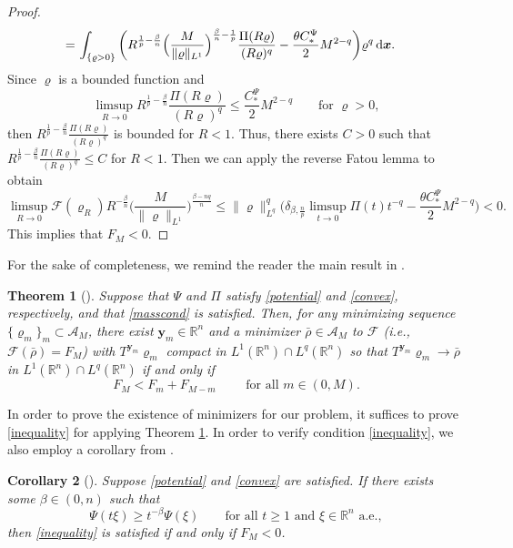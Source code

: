\documentclass[reqno,11pt]{amsart}
\numberwithin{equation}{section}
\newtheorem{theorem}{Theorem}[section]
\newtheorem{corollary}[theorem]{Corollary}
\theoremstyle{definition}
\def\dd{{\, \rm d}}
\begin{document}
\begin{proof}
\begin{align*}
= &\,\int_{\{\varrho > 0\}} \bigg ( R^{\frac{1}{p} 
- \frac{\beta}{n}} 
\Big( \frac{M}{\| \varrho \|_{L^1}} \Big)^{\frac{\beta}{n}-\frac{1}{p}}\frac{\Pi(R\varrho)}{(R\varrho)^q} 
- \frac{\theta C_*^\Psi}{2} M^{2-q} \bigg ) \varrho^q \dd \boldsymbol{x}.
\end{align*}
Since $\varrho$ is a bounded function and 
$$
\limsup_{R \to 0} R^{\frac{1}{p} - \frac{\beta}{n}}\frac{\Pi(R \varrho)}{(R \varrho)^q} 
\leq  \frac{C_*^\Psi}{2} M^{2-q} \qquad\mbox{for $\varrho > 0$},
$$
then $R^{\frac{1}{p} - \frac{\beta}{n}}\frac{\Pi(R \varrho)}{(R \varrho)^q}$ is bounded for $R<1$. 
Thus, there exists $C>0$ such that $R^{\frac{1}{p} - \frac{\beta}{n}}\frac{\Pi(R \varrho)}{(R \varrho)^q} 
\leq C$ for $R<1$. Then we can apply the reverse Fatou lemma to obtain 
\[
\limsup_{R \to 0} \mathcal{F}(\varrho_R) R^{- \frac{\beta}{n}} 
\Big( \frac{M}{\| \varrho \|_{L^1}} \Big)^{\frac{\beta-nq}{n}} 
\leq \| \varrho \|^q_{L^q} \Big ( \delta_{\beta, \frac{n}{p}} \limsup_{t \to 0} \Pi(t) t^{-q} 
- \frac{\theta C_*^\Psi}{2}  M^{2-q} \Big ) < 0.
\]
This implies that $F_M < 0$.
\end{proof}

For the sake of completeness, we remind the reader the main result in \cite{Lions_1984}.

\begin{theorem}[]
\label{minimizer}
Suppose that $\Psi$ and $\Pi$ satisfy \eqref{potential} and \eqref{convex}, respectively, 
and that \eqref{masscond} is satisfied. 
Then, for any minimizing sequence $\{\varrho_m\}_m \subset \mathcal{A}_M$, 
there exist $\boldsymbol{y}_m \in \mathbb{R}^n$ and 
a minimizer $\bar{\rho} \in \mathcal{A}_M$ to $\mathcal{F}$ {\rm(}{\it i.e.,} 
$\mathcal{F}(\bar{\rho}) = F_M${\rm)} 
with $T^{\boldsymbol{y}_m} \varrho_m$ compact in $L^1(\mathbb{R}^n) \cap L^q(\mathbb{R}^n)$
so that $T^{\boldsymbol{y}_m} \varrho_m \to \bar{\rho}$ in $L^1(\mathbb{R}^n) \cap L^q(\mathbb{R}^n)$
if and only if
\begin{equation}\label{inequality}
    F_M < F_m + F_{M - m} \qquad \text{ for all } m \in (0,M).
\end{equation}
\end{theorem}

In order to prove the existence of minimizers for our problem, it suffices to prove \eqref{inequality} for applying Theorem \ref{minimizer}. In order to verify condition \eqref{inequality}, we also employ a corollary from \cite{Lions_1984}.

\begin{corollary}[]
\label{cor}
Suppose \eqref{potential} and \eqref{convex} are satisfied.
If there exists some $\beta \in (0,n)$ such that
    \[
  \Psi(t \xi) \geq t^{-\beta} \Psi(\xi)
 \qquad\mbox{for all $t \geq 1$ and $\xi \in \mathbb{R}^n$ a.e.},
    \]
then \eqref{inequality} is satisfied if and only if $F_M < 0$.
\end{corollary}
\end{document}
